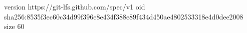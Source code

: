 version https://git-lfs.github.com/spec/v1
oid sha256:8535f3ec60c34d99f396e8e434f388e89f434d450ae4802533318e4d0dee2008
size 60
